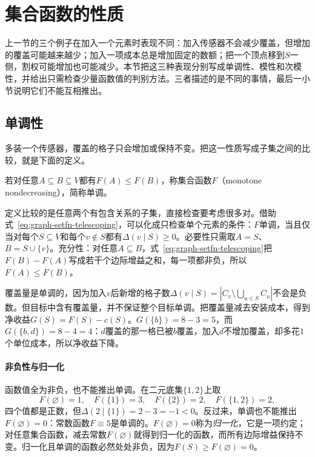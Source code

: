 
\section{集合函数的性质}
\label{sec:graph-set-function-properties}

上一节的三个例子在加入一个元素时表现不同：加入传感器不会减少覆盖，但增加的覆盖可能越来越少；加入一项成本总是增加固定的数额；把一个顶点移到$S$一侧，割权可能增加也可能减少。本节把这三种表现分别写成单调性、模性和次模性，并给出只需检查少量函数值的判别方法。三者描述的是不同的事情，最后一小节说明它们不能互相推出。

\subsection{单调性}
\label{sec:graph-setfn-monotonicity}

多装一个传感器，覆盖的格子只会增加或保持不变。把这一性质写成子集之间的比较，就是下面的定义。

\begin{definition}[单调非减]
\label{def:graph-setfn-monotone}
若对任意$A\subseteq B\subseteq V$都有$F(A)\leq F(B)$，称集合函数$F$（monotone nondecreasing），简称单调。
\end{definition}

定义比较的是任意两个有包含关系的子集，直接检查要考虑很多对。借助式~\eqref{eq:graph-setfn-telescoping}，可以化成只检查单个元素的条件：$F$单调，当且仅当对每个$S\subseteq V$和每个$v\notin S$都有$\Delta(v\mid S)\geq0$。必要性只需取$A=S$、$B=S\cup\{v\}$。充分性：对任意$A\subseteq B$，式~\eqref{eq:graph-setfn-telescoping}把$F(B)-F(A)$写成若干个边际增益之和，每一项都非负，所以$F(A)\leq F(B)$。

覆盖量是单调的，因为加入$v$后新增的格子数$\Delta(v\mid S)=|C_v\setminus\bigcup_{u\in S}C_u|$不会是负数。但目标中含有覆盖量，并不保证整个目标单调。把覆盖量减去安装成本，得到净收益$G(S)=F(S)-c(S)$。$G(\{b\})=8-3=5$，而$G(\{b,d\})=8-4=4$：$d$覆盖的那一格已被$b$覆盖，加入$d$不增加覆盖，却多花$1$个单位成本，所以净收益下降。

\paragraph{非负性与归一化}
函数值全为非负，也不能推出单调。在二元底集$\{1,2\}$上取
\[
  F(\varnothing)=1,\quad F(\{1\})=3,\quad F(\{2\})=2,\quad F(\{1,2\})=2,
\]
四个值都是正数，但$\Delta(2\mid\{1\})=2-3=-1<0$。反过来，单调也不能推出$F(\varnothing)=0$：常数函数$F\equiv5$是单调的。$F(\varnothing)=0$称为\emph{归一化}，它是一项约定；对任意集合函数，减去常数$F(\varnothing)$就得到归一化的函数，而所有边际增益保持不变。归一化且单调的函数必然处处非负，因为$F(S)\geq F(\varnothing)=0$。

